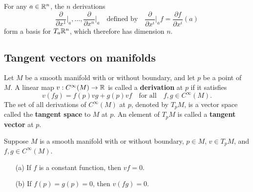 \begin{corollary}\label{tangent R^n basis}
For any $a\in\mathbb{R}^n$, the $n$ derivations
\[\frac{\partial}{\partial x^1}\Big|_a,\dots,\frac{\partial}{\partial x^n}\Big|_a\quad\text{defined by}\quad\frac{\partial}{\partial x^i}\Big|_af=\frac{\partial f}{\partial x^i}(a)\]
form a basis for $T_a\mathbb{R}^n$, which therefore has dimension $n$.
\end{corollary}
\subsection{Tangent vectors on manifolds}
Let $M$ be a smooth manifold with or without boundary, and let $p$ be a point of $M$. A linear map $v:C^\infty(M)\to\mathbb{R}$ is called a \textbf{derivation} at $p$ if it satisfies
\[v(fg)=f(p)vg+g(p)vf\quad\text{for all}\quad f,g\in C^\infty(M).\]
The set of all derivations of $C^\infty(M)$ at $p$, denoted by $T_pM$, is a vector space called the \textbf{tangent space} to $M$ at $p$. An element of $T_pM$ is called a \textbf{tangent vector} at $p$.
\begin{lemma}
Suppose $M$ is a smooth manifold with or without boundary, $p\in M$, $v\in T_pM$, and $f,g\in C^\infty(M)$.
\begin{itemize}
\item[(a)] If $f$ is a constant function, then $vf=0$.
\item[(b)] If $f(p)=g(p)=0$, then $v(fg)=0$.
\end{itemize}
\end{lemma}

